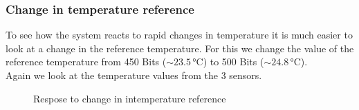 \documentclass[12pt]{scrartcl}
\begin{document}
      \subsubsection{Change in temperature reference}
      To see how the system reacts to rapid changes in temperature it is much
      easier to look at a change in the reference temperature. For this we
      change the value of the reference temperature from 450 Bits ($\sim 23.5
      \,\text{°C}$) to 500 Bits ($\sim 24.8 \,\text{°C}$). \\
      Again we look at the temperature values from the 3 sensors.
      \begin{figure}[h!]
        \hspace{-40pt}
        \hspace{-20pt}
        \caption{Respose to change in intemperature reference}
        \label{fig12}
      \end{figure} \\
\end{document}

